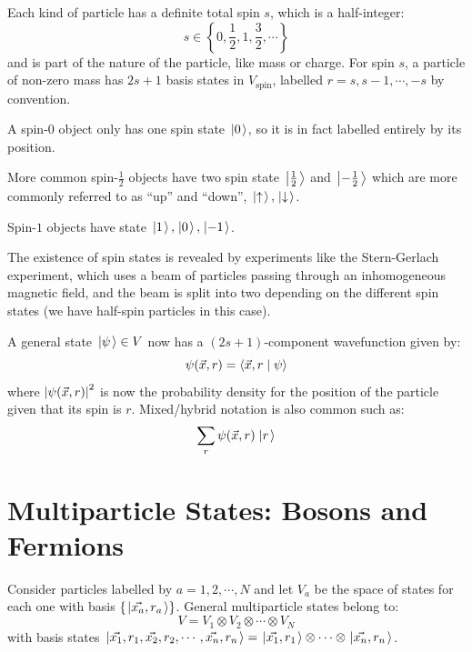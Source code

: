 \documentclass[../Main.tex]{subfiles}
\begin{document}
Each kind of particle has a definite total spin $s$, which is a half-integer:
\begin{equation*}
    s \in \left\{0, \frac12, 1, \frac32, \cdots\right\}
\end{equation*}
and is part of the nature of the particle, like mass or charge. For spin $s$, a particle of non-zero mass has $2s+1$ basis states in $V_{\text{spin}}$, labelled $r = s, s-1, \cdots, -s$ by convention.
\begin{example}
    A spin-$0$ object only has one spin state $\left.\left|0\right.\right\rangle$, so it is in fact labelled entirely by its position.

    More common spin-$\frac12$ objects have two spin state $\left.\left|\frac12\right.\right\rangle$ and $\left.\left|-\frac12\right.\right\rangle$ which are more commonly referred to as ``up'' and ``down'', $\left.\left|\uparrow\right.\right\rangle, \left.\left|\downarrow\right.\right\rangle$.

    Spin-$1$ objects have state $\left.\left|1\right.\right\rangle, \left.\left|0\right.\right\rangle, \left.\left|-1\right.\right\rangle$.
\end{example}
The existence of spin states is revealed by experiments like the Stern-Gerlach experiment, which uses a beam of particles passing through an inhomogeneous magnetic field, and the beam is split into two depending on the different spin states (we have half-spin particles in this case).

A general state $\left.\left|\psi\right.\right\rangle \in V$ now has a $(2s+1)$-component wavefunction given by:
\begin{equation*}
    \psi(\vec{x}, r) = \langle\vec{x}, r\mid\psi\rangle
\end{equation*}
where $\left|\psi(\vec{x}, r)\right|^2$ is now the probability density for the position of the particle given that its spin is $r$. Mixed/hybrid notation is also common such as:
\begin{equation*}
    \sum_r \psi(\vec{x}, r)\left.\left|r\right.\right\rangle
\end{equation*}
\section{Multiparticle States: Bosons and Fermions}
Consider particles labelled by $a = 1, 2, \cdots, N$ and let $V_a$ be the space of states for each one with basis $\{\left.\left|\vec{x_a}, r_a\right.\right\rangle\}$. General multiparticle states belong to:
\begin{equation*}
    V = V_1 \otimes V_2 \otimes \cdots \otimes V_N
\end{equation*}
with basis states $\left.\left|\vec{x_1}, r_1, \vec{x_2}, r_2, \cdots, \vec{x_n}, r_n\right.\right\rangle = \left.\left|\vec{x_1}, r_1\right.\right\rangle \otimes \cdots \otimes \left.\left|\vec{x_n}, r_n\right.\right\rangle$.
\end{document}
